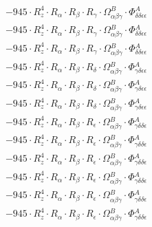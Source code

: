 \documentclass{article}
\begin{document}
\begin{subequations}
\begin{gather}
\begin{array}{c}
 \\[0.2em] 		 - 945 \cdot R_{z}^{4} \cdot R_{\alpha{}} \cdot R_{\beta{}} \cdot R_{\gamma{}} \cdot \Omega{}^{B}_{\alpha{}\beta{}\gamma{}} \cdot \Phi{}^{A}_{\delta{}\delta{}\epsilon{}\epsilon{}} 
 \\[0.2em] 		 - 945 \cdot R_{z}^{4} \cdot R_{\alpha{}} \cdot R_{\beta{}} \cdot R_{\gamma{}} \cdot \Omega{}^{B}_{\alpha{}\beta{}\gamma{}} \cdot \Phi{}^{A}_{\delta{}\delta{}\epsilon{}\epsilon{}} 
 \\[0.2em] 		 - 945 \cdot R_{z}^{4} \cdot R_{\alpha{}} \cdot R_{\beta{}} \cdot R_{\gamma{}} \cdot \Omega{}^{B}_{\alpha{}\beta{}\gamma{}} \cdot \Phi{}^{A}_{\delta{}\delta{}\epsilon{}\epsilon{}} 
 \\[0.2em] 		 - 945 \cdot R_{z}^{4} \cdot R_{\alpha{}} \cdot R_{\beta{}} \cdot R_{\delta{}} \cdot \Omega{}^{B}_{\alpha{}\beta{}\gamma{}} \cdot \Phi{}^{A}_{\gamma{}\delta{}\epsilon{}\epsilon{}} 
 \\[0.2em] 		 - 945 \cdot R_{z}^{4} \cdot R_{\alpha{}} \cdot R_{\beta{}} \cdot R_{\delta{}} \cdot \Omega{}^{B}_{\alpha{}\beta{}\gamma{}} \cdot \Phi{}^{A}_{\gamma{}\delta{}\epsilon{}\epsilon{}} 
 \\[0.2em] 		 - 945 \cdot R_{z}^{4} \cdot R_{\alpha{}} \cdot R_{\beta{}} \cdot R_{\delta{}} \cdot \Omega{}^{B}_{\alpha{}\beta{}\gamma{}} \cdot \Phi{}^{A}_{\gamma{}\delta{}\epsilon{}\epsilon{}} 
 \\[0.2em] 		 - 945 \cdot R_{z}^{4} \cdot R_{\alpha{}} \cdot R_{\beta{}} \cdot R_{\epsilon{}} \cdot \Omega{}^{B}_{\alpha{}\beta{}\gamma{}} \cdot \Phi{}^{A}_{\gamma{}\delta{}\delta{}\epsilon{}} 
 \\[0.2em] 		 - 945 \cdot R_{z}^{4} \cdot R_{\alpha{}} \cdot R_{\beta{}} \cdot R_{\epsilon{}} \cdot \Omega{}^{B}_{\alpha{}\beta{}\gamma{}} \cdot \Phi{}^{A}_{\gamma{}\delta{}\delta{}\epsilon{}} 
 \\[0.2em] 		 - 945 \cdot R_{z}^{4} \cdot R_{\alpha{}} \cdot R_{\beta{}} \cdot R_{\epsilon{}} \cdot \Omega{}^{B}_{\alpha{}\beta{}\gamma{}} \cdot \Phi{}^{A}_{\gamma{}\delta{}\delta{}\epsilon{}} 
 \\[0.2em] 		 - 945 \cdot R_{z}^{4} \cdot R_{\alpha{}} \cdot R_{\beta{}} \cdot R_{\epsilon{}} \cdot \Omega{}^{B}_{\alpha{}\beta{}\gamma{}} \cdot \Phi{}^{A}_{\gamma{}\delta{}\delta{}\epsilon{}} 
 \\[0.2em] 		 - 945 \cdot R_{z}^{4} \cdot R_{\alpha{}} \cdot R_{\beta{}} \cdot R_{\epsilon{}} \cdot \Omega{}^{B}_{\alpha{}\beta{}\gamma{}} \cdot \Phi{}^{A}_{\gamma{}\delta{}\delta{}\epsilon{}} 
 \\[0.2em] 		 - 945 \cdot R_{z}^{4} \cdot R_{\alpha{}} \cdot R_{\beta{}} \cdot R_{\epsilon{}} \cdot \Omega{}^{B}_{\alpha{}\beta{}\gamma{}} \cdot \Phi{}^{A}_{\gamma{}\delta{}\delta{}\epsilon{}} 

\end{array}
\end{gather}
\end{subequations}
\end{document}
